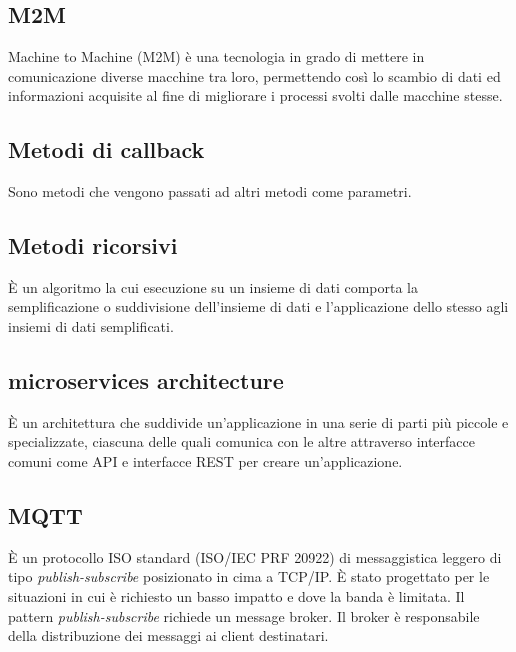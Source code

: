 \section{}
\subsection*{M2M} Machine to Machine (M2M) è una tecnologia in grado di mettere in comunicazione diverse macchine tra loro, permettendo così lo scambio di dati ed informazioni acquisite al fine di migliorare i processi svolti dalle macchine stesse.
\subsection*{Metodi di callback} Sono metodi che vengono passati ad altri metodi come parametri.
\subsection*{Metodi ricorsivi} È un algoritmo la cui esecuzione su un insieme di dati comporta la semplificazione o suddivisione dell'insieme di dati e l'applicazione dello stesso agli insiemi di dati semplificati.
\subsection*{microservices architecture} È un architettura che suddivide un’applicazione in una serie di parti più piccole e specializzate, ciascuna delle quali comunica con le altre attraverso interfacce comuni come API e interfacce REST per creare un’applicazione.
\subsection*{MQTT} È un protocollo ISO standard (ISO/IEC PRF 20922) di messaggistica leggero di tipo \textit{publish-subscribe} posizionato in cima a TCP/IP. È stato progettato per le situazioni in cui è richiesto un basso impatto e dove la banda è limitata. Il pattern \textit{publish-subscribe} richiede un message broker. Il broker è responsabile della distribuzione dei messaggi ai client destinatari.